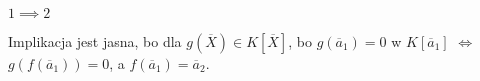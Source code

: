 







$1\implies 2$

Implikacja jest jasna, bo dla $g(\overline X)\in K[\overline X]$, bo $g(\overline a_1)=0$ w $K[\overline a_1]$ $\iff$ $g(f(\overline a_1))=0$, a $f(\overline a_1)=\overline a_2$.

